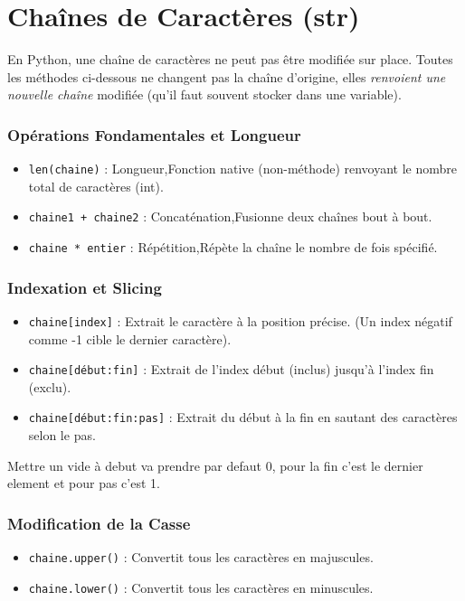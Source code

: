 \section{Chaînes de Caractères (str)}
En Python, une chaîne de caractères ne peut pas être modifiée sur place. Toutes les méthodes ci-dessous ne changent pas la chaîne d'origine, elles \textit{renvoient une nouvelle chaîne} modifiée (qu'il faut souvent stocker dans une variable).

\subsubsection{Opérations Fondamentales et Longueur}

\begin{itemize}
\item \texttt{len(chaine)} : Longueur,Fonction native (non-méthode) renvoyant le nombre total de caractères (int).
\item \texttt{chaine1 + chaine2} : Concaténation,Fusionne deux chaînes bout à bout.
\item \texttt{chaine * entier} : Répétition,Répète la chaîne le nombre de fois spécifié.
\end{itemize}

\subsubsection{Indexation et Slicing}

\begin{itemize}

\item \texttt{chaine[index]} : Extrait le caractère à la position précise. (Un index négatif comme -1 cible le dernier caractère).
\item \texttt{chaine[début:fin]} : Extrait de l'index début (inclus) jusqu'à l'index fin (exclu).
\item \texttt{chaine[début:fin:pas]} : Extrait du début à la fin en sautant des caractères selon le pas.
\end{itemize}

Mettre un vide à debut va prendre par defaut 0, pour la fin c'est le dernier element et pour pas c'est 1.

\subsubsection{Modification de la Casse}

\begin{itemize}
\item \texttt{chaine.upper()} : Convertit tous les caractères en majuscules.
\item \texttt{chaine.lower()} : Convertit tous les caractères en minuscules.
\end{itemize}
			
				
		